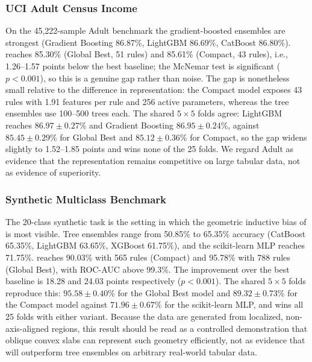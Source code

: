 

\subsubsection{UCI Adult Census Income}
On the 45{,}222-sample Adult benchmark the gradient-boosted ensembles are
strongest (Gradient Boosting 86.87\%, LightGBM 86.69\%, CatBoost 86.80\%).
\modelname{} reaches 85.30\% (Global Best, 51 rules) and 85.61\% (Compact, 43
rules), i.e., 1.26--1.57 points below the best baseline; the McNemar test is
significant ($p < 0.001$), so this is a genuine gap rather than noise. The gap is
nonetheless small relative to the difference in representation: the Compact model
exposes 43 rules with 1.91 features per rule and 256 active parameters, whereas
the tree ensembles use 100--500 trees each. The shared $5\times5$ folds agree:
LightGBM reaches $86.97 \pm 0.27\%$ and Gradient Boosting $86.95 \pm 0.24\%$,
against $85.45 \pm 0.29\%$ for Global Best and $85.12 \pm 0.36\%$ for Compact, so
the gap widens slightly to 1.52--1.85 points and \modelname{} wins none of the 25
folds. We regard Adult as evidence that the representation remains competitive on
large tabular data, not as evidence of superiority.

\subsubsection{Synthetic Multiclass Benchmark}
The 20-class synthetic task is the setting in which the geometric inductive bias
of \modelname{} is most visible. Tree ensembles range from 50.85\% to 65.35\%
accuracy (CatBoost 65.35\%, LightGBM 63.65\%, XGBoost 61.75\%), and the
scikit-learn MLP reaches 71.75\%. \modelname{} reaches 90.03\% with 565 rules
(Compact) and 95.78\% with 788 rules (Global Best), with ROC-AUC above 99.3\%.
The improvement over the best baseline is 18.28 and 24.03 points respectively
($p < 0.001$). The shared $5\times5$ folds reproduce this: $95.58 \pm 0.40\%$
for the Global Best model and $89.32 \pm 0.73\%$ for the Compact model against
$71.96 \pm 0.67\%$ for the scikit-learn MLP, and \modelname{} wins all 25 folds
with either variant. Because the data are generated from localized,
non-axis-aligned regions, this result should be read as a controlled
demonstration that oblique convex slabs can represent such geometry efficiently,
not as evidence that \modelname{} will outperform tree ensembles on arbitrary
real-world tabular data.

